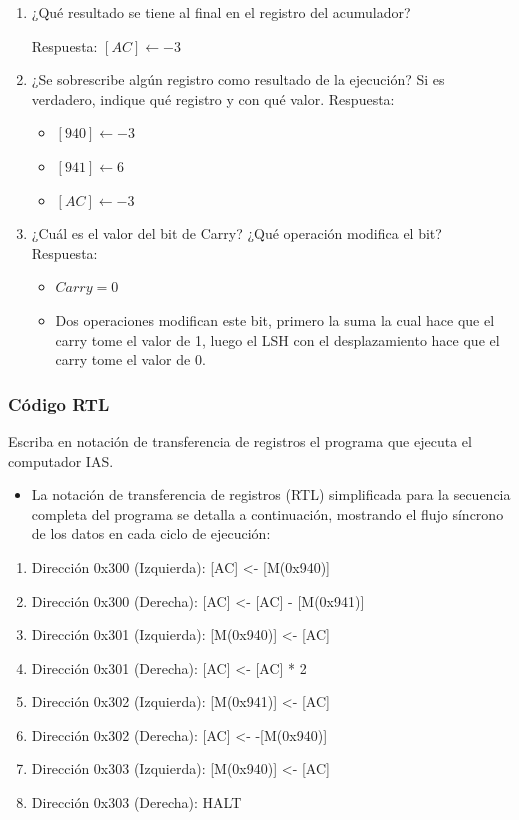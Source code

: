 \documentclass{article}
\begin{document}
\begin{enumerate}
\item ¿Qué resultado se tiene al final en el registro del acumulador?

Respuesta:
\([AC] \leftarrow -3\)

\item ¿Se sobrescribe algún registro como resultado de la ejecución? Si
es verdadero, indique qué registro y con qué valor.
Respuesta:
\begin{itemize}
\item \([940] \leftarrow -3\)
\item \([941] \leftarrow 6\)
\item \([AC] \leftarrow -3\)
\end{itemize}

\item ¿Cuál es el valor del bit de Carry? ¿Qué operación modifica el bit?
Respuesta:
\begin{itemize}
\item \(Carry = 0\)

\item Dos operaciones modifican este bit, primero la suma la cual hace
que el carry tome el valor de 1, luego el LSH con el
desplazamiento hace que el carry tome el valor de 0.
\end{itemize}
\end{enumerate}

\subsubsection{Código RTL}
\label{sec:orga4903a1}

Escriba en notación de transferencia de registros el programa que
ejecuta el computador IAS.

\begin{itemize}
\item La notación de transferencia de registros (RTL) simplificada para la secuencia completa del programa se detalla a continuación, mostrando el flujo síncrono de los datos en cada ciclo de ejecución:
\end{itemize}
\begin{enumerate}
\item Dirección 0x300 (Izquierda): [AC] <- [M(0x940)]
\item Dirección 0x300 (Derecha):   [AC] <- [AC] - [M(0x941)]
\item Dirección 0x301 (Izquierda): [M(0x940)] <- [AC]
\item Dirección 0x301 (Derecha):   [AC] <- [AC] * 2
\item Dirección 0x302 (Izquierda): [M(0x941)] <- [AC]
\item Dirección 0x302 (Derecha):   [AC] <- -[M(0x940)]
\item Dirección 0x303 (Izquierda): [M(0x940)] <- [AC]
\item Dirección 0x303 (Derecha):   HALT
\end{enumerate}
\end{document}
